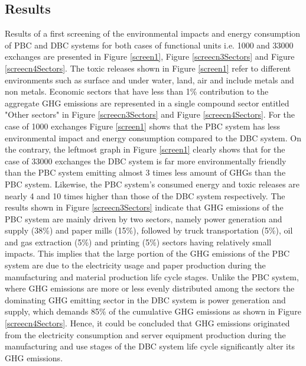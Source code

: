 \documentclass[conference]{IEEEtran}
\begin{document}
 \subsection{Results}
Results of a first screening of the environmental impacts and energy consumption of PBC and DBC systems for both cases of functional units i.e. 1000 and 33000 exchanges are presented in Figure \ref{screen1}, Figure \ref{screecn3Sectors} and Figure \ref{screecn4Sectors}. The toxic releases shown in Figure \ref{screen1} refer to different environments such as surface and under water, land, air and include metals and non metals. Economic sectors that have less than 1\% contribution to the aggregate GHG emissions are represented in a single compound sector entitled "Other sectors" in Figure \ref{screecn3Sectors} and Figure \ref{screecn4Sectors}. For the case of 1000 exchanges Figure \ref{screen1} shows that the PBC system has less environmental impact and energy consumption compared to the DBC system. On the contrary, the leftmost graph in Figure \ref{screen1} clearly shows that for the case of 33000 exchanges the DBC system is far more environmentally friendly than the PBC system emitting almost 3 times less amount of GHGs than the PBC system. Likewise, the PBC system's consumed energy and toxic releases are nearly 4 and 10 times higher than those of the DBC system respectively. The results shown in Figure \ref{screecn3Sectors} indicate that GHG emissions of the PBC system are mainly driven by two sectors, namely power generation and supply (38\%) and paper mills (15\%), followed by truck transportation (5\%), oil and gas extraction (5\%) and printing (5\%) sectors having relatively small impacts. This implies that the large portion of the GHG emissions of the PBC system are due to the electricity usage and paper production during the manufacturing and material production life cycle stages. Unlike the PBC system, where GHG emissions are more or less evenly distributed among the sectors the dominating GHG emitting sector in the DBC system is power generation and supply, which demands 85\% of the cumulative GHG emissions as shown in Figure \ref{screecn4Sectors}. Hence, it could be concluded that GHG emissions originated from the electricity consumption and server equipment production during the manufacturing and use stages of the DBC system life cycle significantly alter its GHG emissions. 
\end{document}

